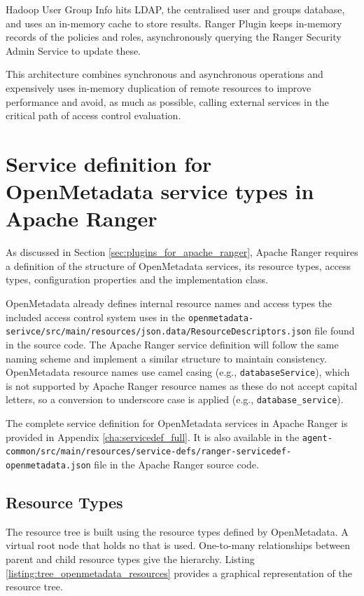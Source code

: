 Hadoop User Group Info hits LDAP, the centralised user and groups database, and uses an in-memory cache to store results. Ranger Plugin keeps in-memory records of the policies and roles, asynchronously querying the Ranger Security Admin Service to update these.

This architecture combines synchronous and asynchronous operations and expensively uses in-memory duplication of remote resources to improve performance and avoid, as much as possible, calling external services in the critical path of access control evaluation.

\section{Service definition for OpenMetadata service types in Apache Ranger}

As discussed in Section \ref{sec:plugins_for_apache_ranger}, Apache Ranger requires a definition of the structure of OpenMetadata services, its resource types, access types, configuration properties and the implementation class. 


OpenMetadata already defines internal resource names and access types the included access control system uses in the \texttt{openmetadata-serivce/src/main/resources/json.data/ResourceDescriptors.json} file found in the source code. The Apache Ranger service definition will follow the same naming scheme and implement a similar structure to maintain consistency. OpenMetadata resource names use camel casing (e.g., \texttt{databaseService}), which is not supported by Apache Ranger resource names as these do not accept capital letters, so a conversion to underscore case is applied (e.g., \texttt{database_service}).

The complete service definition for OpenMetadata services in Apache Ranger is provided in Appendix \ref{cha:servicedef_full}. It is also available in the \texttt{agent-common/src/main/resources/service-defs/ranger-servicedef-openmetadata.json} file in the Apache Ranger source code.

\subsection{Resource Types}

The resource tree is built using the resource types defined by OpenMetadata. A virtual root node that holds no that is used. One-to-many relationships between parent and child resource types give the hierarchy. Listing \ref{listing:tree_openmetadata_resources} provides a graphical representation of the resource tree.

